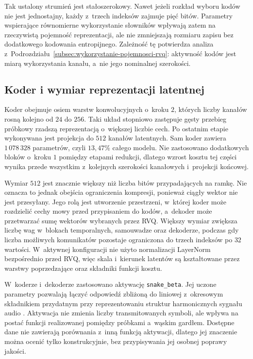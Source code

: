 Tak ustalony strumień jest stałoszerokowy. Nawet jeżeli rozkład wyboru kodów nie jest jednostajny, każdy z~trzech indeksów zajmuje pięć bitów. Parametry wspierające równomierne wykorzystanie słowników wpływają zatem na rzeczywistą pojemność reprezentacji, ale nie zmniejszają rozmiaru zapisu bez dodatkowego kodowania entropijnego. Zależność tę potwierdza analiza z~Podrozdziału~\ref{subsec:wykorzystanie-pojemnosci-rvq}: aktywność kodów jest miarą wykorzystania kanału, a~nie jego nominalnej szerokości.

\subsection{Koder i wymiar reprezentacji latentnej}
\label{subsec:koder-wymiar-latentny}

Koder obejmuje osiem warstw konwolucyjnych o~kroku \(2\), których liczby kanałów rosną kolejno od \(24\) do \(256\). Taki układ stopniowo zastępuje gęsty przebieg próbkowy rzadszą reprezentacją o~większej liczbie cech. Po ostatnim etapie wykonywana jest projekcja do \(512\) kanałów latentnych. Sam koder zawiera \(1\,078\,328\) parametrów, czyli \(13{,}47\%\) całego modelu. Nie zastosowano dodatkowych bloków o~kroku \(1\) pomiędzy etapami redukcji, dlatego wzrost kosztu tej części wynika przede wszystkim z~kolejnych szerokości kanałowych i~projekcji końcowej.

Wymiar \(512\) jest znacznie większy niż liczba bitów przypadających na ramkę. Nie oznacza to jednak obejścia ograniczenia kompresji, ponieważ ciągły wektor nie jest przesyłany. Jego rolą jest utworzenie przestrzeni, w~której koder może rozdzielić cechy mowy przed przypisaniem do kodów, a~dekoder może przetwarzać sumę wektorów wybranych przez RVQ. Większy wymiar zwiększa liczbę wag w~blokach temporalnych, samouwadze oraz dekoderze, podczas gdy liczba możliwych komunikatów pozostaje ograniczona do trzech indeksów po \(32\) wartości. W~aktywnej konfiguracji nie użyto normalizacji LayerNorm bezpośrednio przed RVQ, więc skala i~kierunek latentów są kształtowane przez warstwy poprzedzające oraz składniki funkcji kosztu.

W~koderze i~dekoderze zastosowano aktywację \texttt{snake\_beta}. Jej uczone parametry pozwalają łączyć odpowiedź zbliżoną do liniowej z~okresowym składnikiem przydatnym przy reprezentowaniu struktur harmonicznych sygnału audio \cite{Ziyin2020Snake,Kumar2023ImprovedRVQGAN}. Aktywacja nie zmienia liczby transmitowanych symboli, ale wpływa na postać funkcji realizowanej pomiędzy próbkami a~wąskim gardłem. Dostępne dane nie zawierają porównania z~inną funkcją aktywacji, dlatego jej znaczenie można ocenić tylko konstrukcyjnie, bez przypisywania jej osobnej poprawy jakości.

